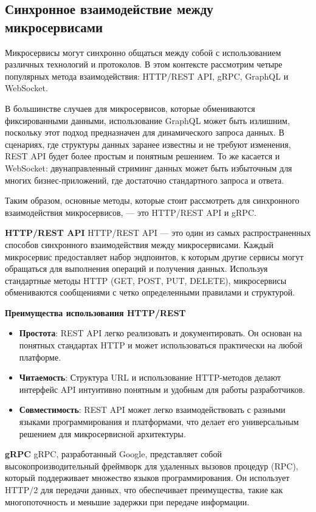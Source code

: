 \subsection{Синхронное взаимодействие между микросервисами}

Микросервисы могут синхронно общаться между собой с использованием различных технологий и протоколов. 
В этом контексте рассмотрим четыре популярных метода взаимодействия: HTTP/REST API, gRPC, GraphQL и WebSocket.

В большинстве случаев для микросервисов, которые обмениваются фиксированными данными, использование GraphQL 
может быть излишним, поскольку этот подход предназначен для динамического запроса данных. В сценариях, 
где структуры данных заранее известны и не требуют изменения, REST API будет более простым и 
понятным решением. То же касается и WebSocket: двунаправленный стриминг данных может быть избыточным для 
многих бизнес-приложений, где достаточно стандартного запроса и ответа.

Таким образом, основные методы, которые стоит рассмотреть для синхронного взаимодействия микросервисов, — 
это HTTP/REST API и gRPC.


\textbf{HTTP/REST API}
HTTP/REST API — это один из самых распространенных способов синхронного взаимодействия между микросервисами. Каждый микросервис предоставляет набор эндпоинтов, к которым другие сервисы могут обращаться для выполнения операций и получения данных. Используя стандартные методы HTTP (GET, POST, PUT, DELETE), микросервисы обмениваются сообщениями с четко определенными правилами и структурой.


\textbf{Преимущества использования HTTP/REST}
\begin{itemize}
    \item \textbf{Простота}: REST API легко реализовать и документировать. Он основан на понятных стандартах HTTP и может использоваться практически на любой платформе.
    \item \textbf{Читаемость}: Структура URL и использование HTTP-методов делают интерфейс API интуитивно понятным и удобным для работы разработчиков.
    \item \textbf{Совместимость}: REST API может легко взаимодействовать с разными языками программирования и платформами, что делает его универсальным решением для микросервисной архитектуры.
\end{itemize}


\textbf{gRPC}
gRPC, разработанный Google, представляет собой высокопроизводительный фреймворк для удаленных вызовов процедур (RPC), который поддерживает множество языков программирования. Он использует HTTP/2 для передачи данных, что обеспечивает преимущества, такие как многопоточность и меньшие задержки при передаче информации.


